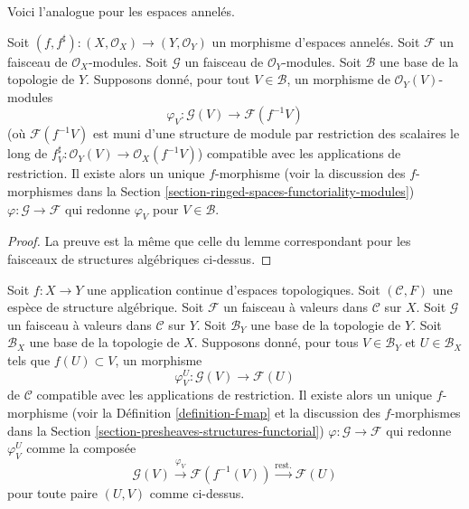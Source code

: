 \noindent
Voici l'analogue pour les espaces annelés.

\begin{lemma}
\label{lemma-f-map-basis-below-modules}
Soit $(f, f^\sharp) : (X, \mathcal{O}_X) \to (Y, \mathcal{O}_Y)$
un morphisme d'espaces annelés.
Soit $\mathcal{F}$ un faisceau de $\mathcal{O}_X$-modules.
Soit $\mathcal{G}$ un faisceau de $\mathcal{O}_Y$-modules.
Soit $\mathcal{B}$ une base de la topologie de $Y$.
Supposons donné, pour tout $V \in \mathcal{B}$, un
morphisme de $\mathcal{O}_Y(V)$-modules
$$
\varphi_V :
\mathcal{G}(V)
\longrightarrow
\mathcal{F}(f^{-1}V)
$$
(où $\mathcal{F}(f^{-1}V)$ est muni d'une structure de module par restriction des scalaires le long de
$f^\sharp_V : \mathcal{O}_Y(V) \to \mathcal{O}_X(f^{-1}V)$)
compatible avec les applications de restriction.
Il existe alors un unique $f$-morphisme (voir la discussion des $f$-morphismes dans la
Section \ref{section-ringed-spaces-functoriality-modules})
$\varphi : \mathcal{G} \to \mathcal{F}$
qui redonne $\varphi_V$ pour $V \in \mathcal{B}$.
\end{lemma}

\begin{proof}
La preuve est la même que celle du lemme correspondant
pour les faisceaux de structures algébriques ci-dessus.
\end{proof}

\begin{lemma}
\label{lemma-f-map-basis-above-and-below-structures}
Soit $f : X \to Y$ une application continue d'espaces topologiques.
Soit $(\mathcal{C}, F)$ une espèce de structure algébrique.
Soit $\mathcal{F}$ un faisceau à valeurs dans $\mathcal{C}$ sur $X$.
Soit $\mathcal{G}$ un faisceau à valeurs dans $\mathcal{C}$ sur $Y$.
Soit $\mathcal{B}_Y$ une base de la topologie de $Y$.
Soit $\mathcal{B}_X$ une base de la topologie de $X$.
Supposons donné, pour tous $V \in \mathcal{B}_Y$ et
$U \in \mathcal{B}_X$ tels que $f(U) \subset V$, un morphisme
$$
\varphi_V^U :
\mathcal{G}(V)
\longrightarrow
\mathcal{F}(U)
$$
de $\mathcal{C}$ compatible avec les applications de restriction.
Il existe alors un unique $f$-morphisme (voir
la Définition \ref{definition-f-map} et la discussion
des $f$-morphismes dans la Section \ref{section-presheaves-structures-functorial})
$\varphi : \mathcal{G} \to \mathcal{F}$
qui redonne $\varphi_V^U$ comme la composée
$$
\mathcal{G}(V) \xrightarrow{\varphi_V}
\mathcal{F}(f^{-1}(V)) \xrightarrow{\text{rest.}}
\mathcal{F}(U)
$$
pour toute paire $(U, V)$ comme ci-dessus.
\end{lemma}

